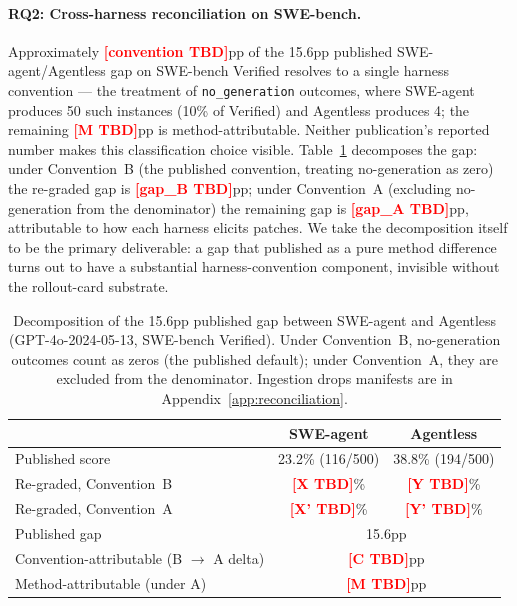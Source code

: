 \documentclass{article}
\newcommand{\expnum}[1]{\textcolor{red}{\textbf{[#1]}}}
\begin{document}
\paragraph{RQ2: Cross-harness reconciliation on SWE-bench.}
Approximately \expnum{convention TBD}pp of the 15.6pp
published SWE-agent/Agentless gap on SWE-bench Verified
resolves to a single harness convention --- the treatment of
\texttt{no\_generation} outcomes, where SWE-agent produces 50
such instances (10\% of Verified) and Agentless produces 4;
the remaining \expnum{M TBD}pp is method-attributable. Neither
publication's reported number makes this classification choice
visible. Table~\ref{tab:reconciliation} decomposes the gap:
under Convention~B (the published convention, treating
no-generation as zero) the re-graded gap is
\expnum{gap\_B TBD}pp; under Convention~A (excluding
no-generation from the denominator) the remaining
gap is \expnum{gap\_A TBD}pp, attributable to how each harness
elicits patches. We take the decomposition itself to be the
primary deliverable: a gap that published as a pure method
difference turns out to have a substantial harness-convention
component, invisible without the rollout-card substrate.

\begin{table}[h]
\centering
\small
\caption{Decomposition of the 15.6pp published gap between
SWE-agent and Agentless (GPT-4o-2024-05-13, SWE-bench
Verified). Under Convention~B, no-generation outcomes count
as zeros (the published default); under
Convention~A, they are excluded from the denominator.
Ingestion drops manifests are in
Appendix~\ref{app:reconciliation}.}
\label{tab:reconciliation}
\begin{tabular}{@{}lcc@{}}
\toprule
 & \textbf{SWE-agent} & \textbf{Agentless} \\
\midrule
Published score & 23.2\% (116/500) & 38.8\% (194/500) \\
Re-graded, Convention~B & \expnum{X TBD}\% & \expnum{Y TBD}\% \\
Re-graded, Convention~A & \expnum{X' TBD}\% & \expnum{Y' TBD}\% \\
\midrule
Published gap & \multicolumn{2}{c}{15.6pp} \\
Convention-attributable (B $\to$ A delta) & \multicolumn{2}{c}{\expnum{C TBD}pp} \\
Method-attributable (under A) & \multicolumn{2}{c}{\expnum{M TBD}pp} \\
\bottomrule
\end{tabular}
\end{table}
\end{document}
